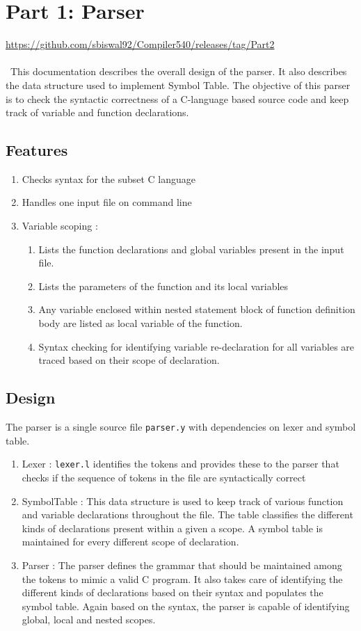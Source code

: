 \documentclass[12pt]{article}
\begin{document}
\section{Part 1: Parser} 

\url{https://github.com/sbiswal92/Compiler540/releases/tag/Part2}
\\~
\\~This documentation describes the overall design of the parser. It also describes the data structure used to implement Symbol Table. The objective of this parser is to check the syntactic correctness of a C-language based source code and keep track of variable and function declarations.

\subsection{Features}
\label{Features}
\begin{enumerate}
\item Checks syntax for the subset C language
\item Handles one input file on command line
\item Variable scoping :
\begin{enumerate}
\item Lists the function declarations and global variables present in the input file.
\item Lists the parameters of the function and its local variables
\item Any variable enclosed within nested statement block of function definition body are listed as local variable of the function. 
\item Syntax checking for identifying variable re-declaration for all variables are traced based on their scope of declaration.
\end{enumerate}
\end{enumerate}


\subsection{Design}

The parser is a single source file \texttt{parser.y} with dependencies on lexer and symbol table.  
\begin{enumerate}
\item Lexer : \texttt{lexer.l} identifies the tokens and provides these to the parser that checks if the sequence of tokens in the file are syntactically correct
\item SymbolTable : This data structure is used to keep track of various function and variable declarations throughout the file. The table classifies the different kinds of declarations present within a given a scope. A symbol table is maintained for every different scope of declaration.
\item Parser : The parser defines the grammar that should be maintained among the tokens to mimic a valid C program. It also takes care of identifying the different kinds of declarations based on their syntax and populates the symbol table. Again based on the syntax, the parser is capable of identifying global, local and nested scopes.
\end{enumerate}
\end{document}
